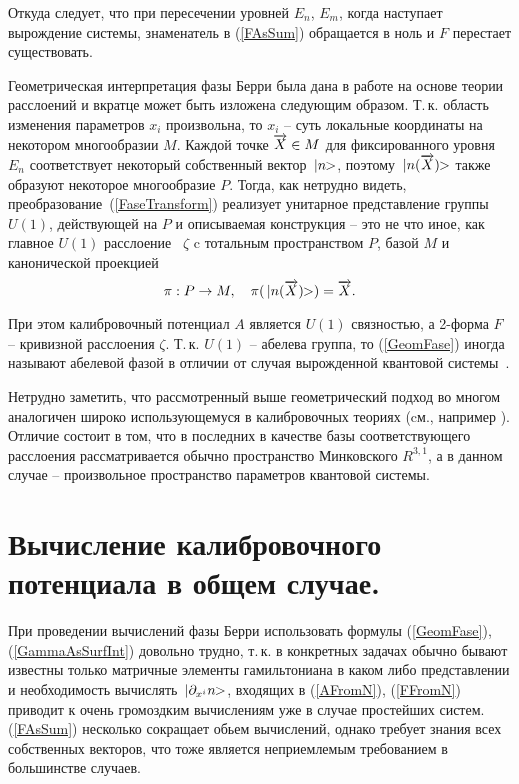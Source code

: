 \documentclass[a4paper,titlepage]{article}
\newcommand{\MathBr}[1]{\ifmmode{#1} \else{$#1$} \fi}
\newcommand{\KetVect}[1]{\MathBr{\,|#1\!\!>}}
\newcommand{\XVect}{\MathBr{\overrightarrow{X}}}
\newcommand{\rf}[1]{(\ref{#1})}
\newcommand{\der}[1]{\MathBr{\partial_{#1}}}
\begin{document}
Откуда следует, что при пересечении уровней $E_n$, $E_m$, когда наступает
вырождение системы, знаменатель в \rf{FAsSum} обращается в ноль и $F$
перестает существовать.

Геометрическая интерпретация фазы Берри была дана в работе \cite{SimonWork}
на основе теории расслоений и вкратце может быть изложена следующим
образом. Т.\,к. область изменения
параметров $x_i$ произвольна, то $x_i$ -- суть локальные координаты на
некотором многообразии $M$. Каждой точке $\XVect \in M$ для фиксированного
уровня $E_n$ соответствует некоторый собственный вектор
$\KetVect{n}$, поэтому $\KetVect{n(\XVect)}$ также образуют некоторое
многообразие $P$. Тогда, как нетрудно видеть,
преобразование~\rf{FaseTransform} реализует
унитарное представление группы $U(1)$, действующей на $P$ и описываемая
конструкция -- это не что иное, как главное \(U(1)\)
расслоение~\cite{PostnikovWork} $\zeta$ c
тотальным пространством $P$, базой $M$ и канонической проекцией
\[
  \pi : P \rightarrow M, \quad \pi(\KetVect{n(\XVect)}) = \XVect.
\]

При этом калибровочный потенциал $A$ является $U(1)$ связностью, а
2-форма $F$ -- кривизной расслоения $\zeta$. Т.\,к. $U(1)$ -- абелева группа,
то \rf{GeomFase} иногда называют абелевой фазой в отличии от случая
вырожденной квантовой системы~\cite{WilzekZeeWork}.

Нетрудно заметить, что рассмотренный выше геометрический подход во многом
аналогичен широко использующемуся в калибровочных теориях
(cм., например \cite{DanielWork}). Отличие состоит в том, что в последних
в качестве базы соответствующего расслоения рассматривается обычно
пространство Минковского $R^{3,1}$, а в данном случае -- произвольное
пространство параметров квантовой системы.

\newpage
\section{Вычисление калибровочного потенциала в общем случае.}

При проведении вычислений фазы Берри использовать
формулы \rf{GeomFase}, \rf{GammaAsSurfInt} довольно трудно, т.\,к.
в конкретных задачах обычно бывают известны только матричные элементы
гамильтониана в каком либо представлении и необходимость
вычислять $\KetVect{\der{x^i}n}$, входящих в \rf{AFromN}, \rf{FFromN}
приводит к очень громоздким вычислениям уже в случае простейших систем.
\rf{FAsSum} несколько сокращает обьем вычислений, однако требует знания
всех собственных векторов, что тоже является неприемлемым требованием в
большинстве случаев.
\end{document}
